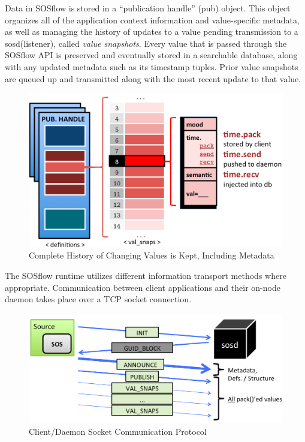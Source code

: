 
Data in SOSflow is stored in a ``publication handle'' (pub) object.
%
This object organizes all of the application context information and
value-specific metadata, as well as managing the history of updates to
a value pending transmission to a sosd(listener), called
\textit{value snapshots}.
%
Every value that is passed through the SOSflow API is preserved and
eventually stored in a searchable database, along with any updated
metadata such as its timestamp tuples.
%
%
Prior value snapshots are queued up and transmitted along
with the most recent update to that value.
\begin{figure}[h]
\centering
\includegraphics[width=\columnwidth]{images/val_snaps.png}
\caption{Complete History of Changing Values is Kept, Including Metadata}
\label{fig_val_snaps}
\end{figure}
%
\par
%
The SOSflow runtime utilizes different information transport methods
where appropriate.
%
Communication between client applications and their on-node daemon
takes place over a TCP socket connection.
%
\begin{figure}[h]
\centering
\includegraphics[width=\columnwidth]{images/sosd_protocol.png}
\caption{Client/Daemon Socket Communication Protocol}
\label{fig_sosd_protocol}
\end{figure}
